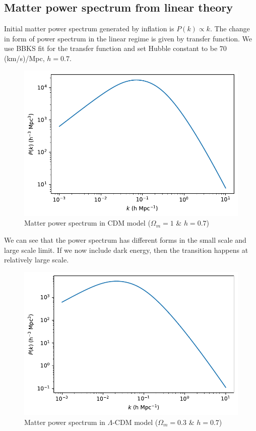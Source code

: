 \documentclass[12pt]{article}
\begin{document}
\subsection{Matter power spectrum from linear theory}
Initial matter power spectrum generated by inflation is $P(k) \propto k$. The change in form of power spectrum in the linear regime is given by transfer function. We use BBKS fit for the transfer function and set Hubble constant to be $ 70$ (km/s)/Mpc, $h=0.7$.

\begin{figure}[H]
	\centering
	\includegraphics[width=0.7\linewidth]{../jupyter-nb/standard-cdm-matter-Pk}
	\caption{Matter power spectrum in CDM model ($\Omega_m=1$ \& $h = 0.7$)}
	\label{fig:standard-cdm-matter-pk}
\end{figure}
We can see that the power spectrum has different forms in the small scale and large scale limit. If we now include dark energy, then the transition happens at relatively large scale.

\begin{figure}[H]
	\centering
	\includegraphics[width=0.7\linewidth]{../jupyter-nb/lambda-cdm-matter-Pk}
	\caption{Matter power spectrum in $\Lambda$-CDM model ($\Omega_m=0.3$ \& $h = 0.7$)}
	\label{fig:lambda-cdm-matter-pk}
\end{figure}
\end{document}
